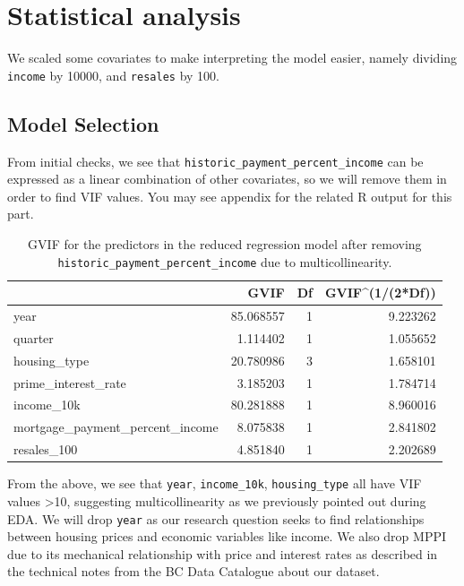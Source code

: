 \documentclass[10pt]{article}
\begin{document}
\section*{Statistical analysis}
We scaled some covariates to make interpreting the model easier, namely dividing \texttt{income} by 10000, and \texttt{resales} by 100.

\subsection*{Model Selection}
From initial checks, we see that \texttt{historic\_payment\_percent\_income} can be expressed as a linear combination of other covariates, so we will remove them in order to find VIF values. You may see appendix for the related R output for this part. \\

\begin{table}[H]
    \centering
    \small
    \begin{tabular}{lrrr}
        \toprule
        & GVIF & Df & GVIF\textasciicircum{}(1/(2*Df)) \\
        \midrule
        year & 85.068557 & 1 & 9.223262 \\
        quarter & 1.114402 & 1 & 1.055652 \\
        housing\_type & 20.780986 & 3 & 1.658101 \\
        prime\_interest\_rate & 3.185203 & 1 & 1.784714 \\
        income\_10k & 80.281888 & 1 & 8.960016 \\
        mortgage\_payment\_percent\_income & 8.075838 & 1 & 2.841802 \\
        resales\_100 & 4.851840 & 1 & 2.202689 \\
        \bottomrule
    \end{tabular}
    \caption{GVIF for the predictors in the reduced regression model after removing \texttt{historic\_payment\_percent\_income} due to multicollinearity.}
\end{table}

From the above, we see that \texttt{year}, \texttt{income\_10k}, \texttt{housing\_type} all have VIF values >10, suggesting multicollinearity as we previously pointed out during EDA. We will drop \texttt{year} as our research question seeks to find relationships between housing prices and economic variables like income. We also drop MPPI due to its mechanical relationship with price and interest rates as described in the technical notes from the BC Data Catalogue about our dataset.
\end{document}
